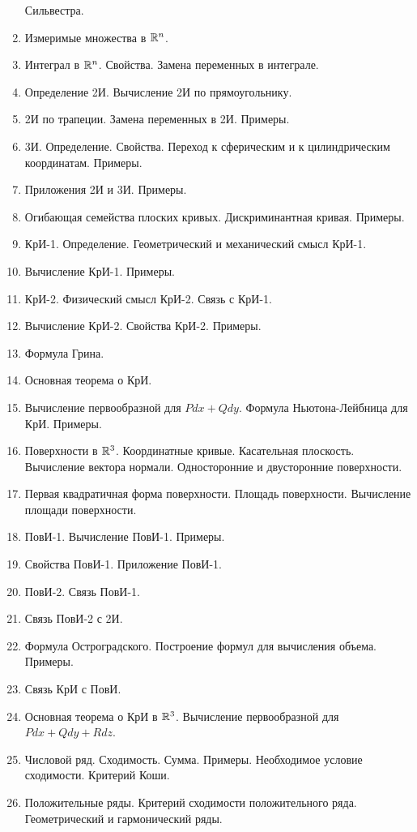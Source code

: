 \documentclass[../main.tex]{subfiles}
\begin{document}
\begin{enumerate}
  Сильвестра.
  \item Измеримые множества в $\mathbb{R}^n$.
  \item Интеграл в $\mathbb{R}^n$. Свойства. Замена переменных в интеграле.
  \item Определение 2И.  Вычисление 2И по прямоугольнику.
  \item 2И по трапеции. Замена переменных в 2И. Примеры.
  \item 3И. Определение. Свойства. Переход к сферическим и к цилиндрическим 
  координатам. Примеры.
  \item Приложения 2И и 3И. Примеры.
  \item Огибающая семейства плоских кривых. Дискриминантная кривая. Примеры.
  \item КрИ-1. Определение. Геометрический и механический смысл КрИ-1.
  \item Вычисление КрИ-1. Примеры.
  \item КрИ-2. Физический смысл КрИ-2. Связь с КрИ-1.
  \item Вычисление КрИ-2. Свойства КрИ-2. Примеры.
  \item Формула Грина.
  \item Основная теорема о КрИ.
  \item Вычисление первообразной для $Pdx+Qdy$. Формула Ньютона-Лейбница для 
  КрИ. Примеры.
  \item Поверхности в $\mathbb{R}^3$. Координатные кривые. Касательная плоскость. 
  Вычисление вектора нормали. Односторонние и двусторонние поверхности.
  \item Первая квадратичная форма поверхности. Площадь поверхности. Вычисление 
  площади поверхности.
  \item ПовИ-1. Вычисление ПовИ-1. Примеры.
  \item Свойства ПовИ-1. Приложение ПовИ-1.
  \item ПовИ-2. Связь ПовИ-1.
  \item Связь ПовИ-2 с 2И.
  \item Формула Остроградского. Построение формул для вычисления объема. 
  Примеры.
  \item Связь КрИ с ПовИ.
  \item Основная теорема о КрИ в $\mathbb{R}^3$. Вычисление первообразной для 
  $Pdx+Qdy+Rdz$.
  \item Числовой ряд. Сходимость. Сумма. Примеры. Необходимое условие 
  сходимости. Критерий Коши.
  \item Положительные ряды. Критерий сходимости положительного ряда. 
  Геометрический и гармонический ряды.

\end{enumerate}
\end{document}
